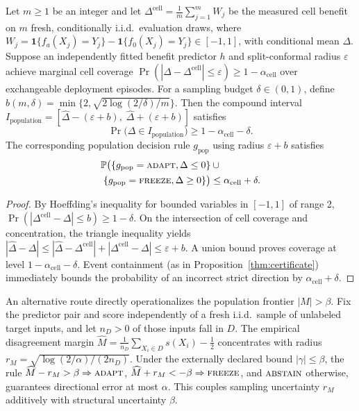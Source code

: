 \begin{proposition}\label{thm:population-transfer}
Let $m\ge1$ be an integer and let $\Delta^{\mathrm{cell}}=\frac{1}{m}\sum_{j=1}^m W_j$ be the measured cell benefit on $m$ fresh,
conditionally i.i.d.\ evaluation draws, where
$W_j=\mathbf 1\{f_a(X_j)=Y_j\}-\mathbf 1\{f_0(X_j)=Y_j\}\in[-1,1]$, with conditional mean $\Delta$.
Suppose an independently fitted benefit predictor $h$ and split-conformal radius $\varepsilon$
achieve marginal cell coverage $\Pr(|\widehat\Delta-\Delta^{\mathrm{cell}}|\le\varepsilon)\ge 1-\alpha_{\mathrm{cell}}$
over exchangeable deployment episodes. For a sampling budget $\delta\in(0,1)$, define
$b(m,\delta)=\min\{2, \sqrt{2\log(2/\delta)/m}\}$. Then the compound interval
$I_{\mathrm{population}}=[\widehat\Delta-(\varepsilon+b),\; \widehat\Delta+(\varepsilon+b)]$ satisfies
\[
\Pr\bigl(\Delta\in I_{\mathrm{population}}\bigr)\ge 1-\alpha_{\mathrm{cell}}-\delta.
\]
The corresponding population decision rule $g_{\mathrm{pop}}$ using radius $\varepsilon+b$ satisfies
\begin{align*}
\mathbb{P}\bigl(\{g_{\mathrm{pop}}=\textnormal{\textsc{adapt}}, \Delta\le0\} &\cup {} \\
\{g_{\mathrm{pop}}=\textnormal{\textsc{freeze}}, \Delta\ge0\}\bigr) &\le \alpha_{\mathrm{cell}}+\delta.
\end{align*}
\end{proposition}
\begin{proof}
By Hoeffding's inequality for bounded variables in $[-1,1]$ of range 2,
$\Pr(|\Delta^{\mathrm{cell}}-\Delta|\le b)\ge 1-\delta$. On the intersection of cell coverage
and concentration, the triangle inequality yields $|\widehat\Delta-\Delta|\le |\widehat\Delta-\Delta^{\mathrm{cell}}|+|\Delta^{\mathrm{cell}}-\Delta|\le\varepsilon+b$.
A union bound proves coverage at level $1-\alpha_{\mathrm{cell}}-\delta$. Event containment
(as in Proposition~\ref{thm:certificate}) immediately bounds the probability of an incorrect strict
direction by $\alpha_{\mathrm{cell}}+\delta$.
\end{proof}

\begin{remark}\label{rem:direct-sampled-frontier}
An alternative route directly operationalizes the population frontier $|M|>\beta$. Fix the
predictor pair and score independently of a fresh i.i.d.\ sample of unlabeled target inputs,
and let $n_D>0$ of those inputs fall in $D$. The empirical disagreement margin
$\widehat M=\frac{1}{n_D}\sum_{X_i\in D}s(X_i)-\frac{1}{2}$ concentrates with radius
$r_M=\sqrt{\log(2/\alpha)/(2n_D)}$. Under the externally declared bound $|\gamma|\le\beta$, the rule
$\widehat M-r_M>\beta\Rightarrow\textnormal{\textsc{adapt}}$, $\widehat M+r_M<-\beta\Rightarrow\textnormal{\textsc{freeze}}$, and $\textnormal{\textsc{abstain}}$
otherwise, guarantees directional error at most $\alpha$. This couples sampling uncertainty $r_M$
additively with structural uncertainty $\beta$.
\end{remark}

